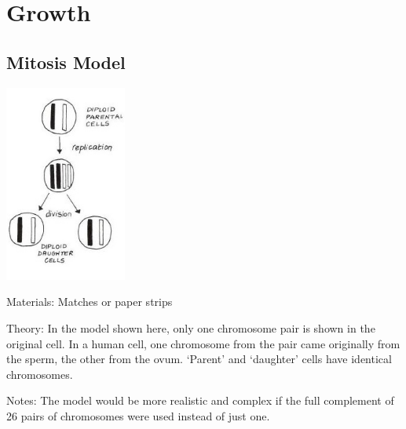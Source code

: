 \section{Growth} 

\begin{multicols}{2}


\subsection{Mitosis Model} %

\begin{center}
\includegraphics[width=0.3\textwidth]{./img/vso/mitosis-model.jpg}
\end{center}

\begin{description*}
\item[Materials:]{Matches or paper strips}
\item[Theory:]{In the model shown here, only
one chromosome pair is shown in
the original cell. In a human cell,
one chromosome from the pair
came originally from the sperm,
the other from the ovum. `Parent'
and `daughter' cells have identical
chromosomes.}
\item[Notes:]{The model would be more
realistic and complex if the full
complement of 26 pairs of
chromosomes were used instead
of just one.}
\end{description*}



\end{multicols}
